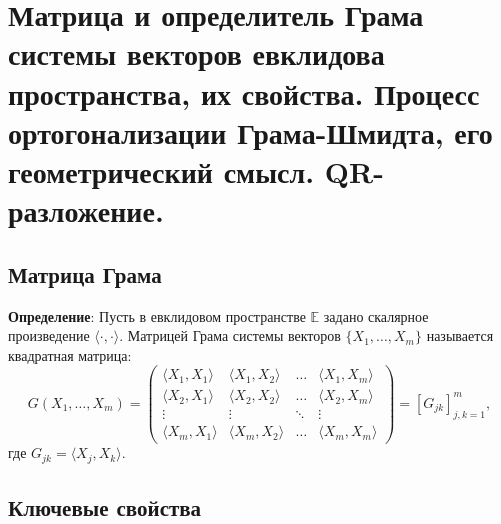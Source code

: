 \documentclass[12pt]{article}
\begin{document}
\section{Матрица и определитель Грама системы векторов евклидова пространства, их свойства. Процесс ортогонализации Грама-Шмидта, его геометрический смысл. QR-разложение.}

\subsection*{Матрица Грама}
\textbf{Определение}: Пусть в евклидовом пространстве $\mathbb{E}$ задано скалярное произведение $\langle \cdot, \cdot \rangle$. Матрицей Грама системы векторов $\{X_1, \dots, X_m\}$ называется квадратная матрица:
$$
G(X_1, \dots, X_m) = 
\begin{pmatrix}
\langle X_1, X_1 \rangle & \langle X_1, X_2 \rangle & \dots & \langle X_1, X_m \rangle \\
\langle X_2, X_1 \rangle & \langle X_2, X_2 \rangle & \dots & \langle X_2, X_m \rangle \\
\vdots & \vdots & \ddots & \vdots \\
\langle X_m, X_1 \rangle & \langle X_m, X_2 \rangle & \dots & \langle X_m, X_m \rangle
\end{pmatrix}
= [G_{jk}]_{j,k=1}^m,
$$
где $G_{jk} = \langle X_j, X_k \rangle$.

\subsection*{Ключевые свойства}
\end{document}
